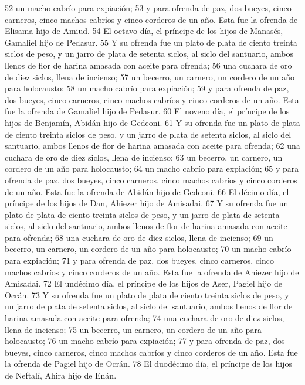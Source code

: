 52 un macho cabrío para expiación;
53 y para ofrenda de paz, dos bueyes, cinco carneros, cinco machos cabríos y cinco corderos de un año. Esta fue la ofrenda de Elisama hijo de Amiud.
54 El octavo día, el príncipe de los hijos de Manasés, Gamaliel hijo de Pedasur.
55 Y su ofrenda fue un plato de plata de ciento treinta siclos   de peso, y un jarro de plata de setenta siclos, al siclo del santuario, ambos llenos de flor de harina amasada con aceite para ofrenda;
56 una cuchara de oro de diez siclos,  llena de incienso;
57 un becerro, un carnero, un cordero de un año para holocausto;
58 un macho cabrío para expiación;
59 y para ofrenda de paz, dos bueyes, cinco carneros, cinco machos cabríos y cinco corderos de un año. Esta fue la ofrenda de Gamaliel hijo de Pedasur.
60 El noveno día, el príncipe de los hijos de Benjamín, Abidán hijo de Gedeoni.
61 Y su ofrenda fue un plato de plata de ciento treinta siclos de peso,  y un jarro de plata de setenta siclos, al siclo del santuario, ambos llenos de flor de harina amasada con aceite para ofrenda;
62 una cuchara de oro de diez siclos,  llena de incienso;
63 un becerro, un carnero, un cordero de un año para holocausto;
64 un macho cabrío para expiación;
65 y para ofrenda de paz, dos bueyes, cinco carneros, cinco machos cabríos y cinco corderos de un año. Esta fue la ofrenda de Abidán hijo de Gedeoni.
66 El décimo día, el príncipe de los hijos de Dan, Ahiezer hijo de Amisadai.
67 Y su ofrenda fue un plato de plata de ciento treinta siclos de peso,  y un jarro de plata de setenta siclos, al siclo del santuario, ambos llenos de flor de harina amasada con aceite para ofrenda;
68 una cuchara de oro de diez siclos,  llena de incienso;
69 un becerro, un carnero, un cordero de un año para holocausto;
70 un macho cabrío para expiación;
71 y para ofrenda de paz, dos bueyes, cinco carneros, cinco machos cabríos y cinco corderos de un año. Esta fue la ofrenda de Ahiezer hijo de Amisadai.
72 El undécimo día, el príncipe de los hijos de Aser, Pagiel hijo de Ocrán.
73 Y su ofrenda fue un plato de plata de ciento treinta siclos de peso,  y un jarro de plata de setenta siclos, al siclo del santuario, ambos llenos de flor de harina amasada con aceite para ofrenda;
74 una cuchara de oro de diez siclos,  llena de incienso;
75 un becerro, un carnero, un cordero de un año para holocausto;
76 un macho cabrío para expiación;
77 y para ofrenda de paz, dos bueyes, cinco carneros, cinco machos cabríos y cinco corderos de un año. Esta fue la ofrenda de Pagiel hijo de Ocrán.
78 El duodécimo día, el príncipe de los hijos de Neftalí, Ahira hijo de Enán.
